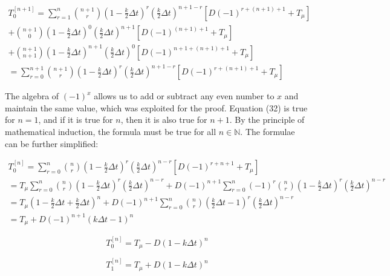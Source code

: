 \documentclass{article}
\begin{document}
\begin{equation}
\begin{split}
        T_0^{[n+1]} = \sum_{r=1}^{n}\binom{n+1}{r}\left(1-\frac{k}{2}\Delta t\right)^{r}\left(\frac{k}{2}\Delta t\right)^{n+1-r}\left[D(-1)^{r+(n+1)+1}+T_\mu\right] \\ +  \binom{n+1}{0}\left(1-\frac{k}{2}\Delta t\right)^0\left(\frac{k}{2}\Delta t\right)^{n+1}\left[D(-1)^{(n+1)+1}+T_\mu\right] \\ + \binom{n+1}{n+1}\left(1-\frac{k}{2}\Delta t\right)^{n+1}\left(\frac{k}{2}\Delta t\right)^{0}\left[D(-1)^{n+1+(n+1)+1}+T_\mu\right] \\= \sum_{r=0}^{n+1}\binom{n+1}{r}\left(1-\frac{k}{2}\Delta t\right)^{r}\left(\frac{k}{2}\Delta t\right)^{n+1-r}\left[D(-1)^{r+(n+1)+1}+T_\mu\right]
\end{split}
\end{equation}

The algebra of $(-1)^x$ allows us to add or subtract any even number to $x$ and maintain the same value, which was exploited for the proof. Equation (32) is true for $n=1$, and if it is true for $n$, then it is also true for $n+1$. By the principle of mathematical induction, the formula must be true for all $n\in\mathbb{N}$. The formulae can be further simplified:

\begin{equation*}
\begin{split}
    T_0^{[n]}=\sum_{r=0}^{n}\binom{n}{r}\left(1-\frac{k}{2}\Delta t\right)^r\left(\frac{k}{2}\Delta t\right)^{n-r}\left[D(-1)^{r+n+1}+T_\mu\right]\\ = T_\mu\sum_{r=0}^{n}\binom{n}{r}\left(1-\frac{k}{2}\Delta t\right)^r\left(\frac{k}{2}\Delta t\right)^{n-r} + D(-1)^{n+1}\sum_{r=0}^{n}(-1)^r\binom{n}{r}\left(1-\frac{k}{2}\Delta t\right)^r\left(\frac{k}{2}\Delta t\right)^{n-r}\\ = T_\mu\left(1-\frac{k}{2}\Delta t+\frac{k}{2}\Delta t\right)^n + D(-1)^{n+1}\sum_{r=0}^{n}\binom{n}{r}\left(\frac{k}{2}\Delta t-1\right)^r\left(\frac{k}{2}\Delta t\right)^{n-r}
    \\ = T_\mu+ D(-1)^{n+1}(k\Delta t-1)^n
\end{split}
\end{equation*}

\begin{equation}
    T_0^{[n]} = T_\mu- D(1-k\Delta t)^n
\end{equation}

\begin{equation}
    T_1^{[n]} = T_\mu+ D(1-k\Delta t)^n
\end{equation}
\end{document}
